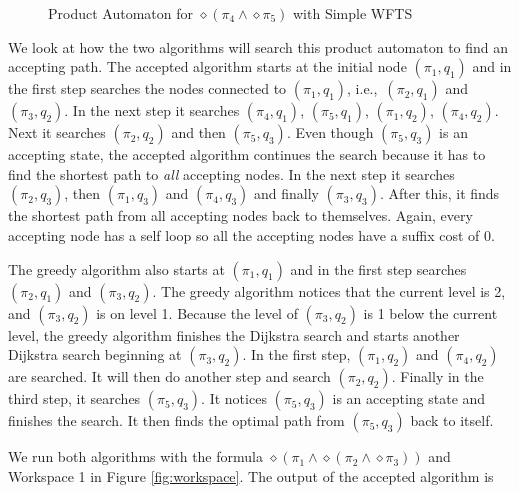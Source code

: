 \begin{figure}
\caption{Product Automaton for $\diamond (\pi_4 \wedge \diamond \pi_5)$ with Simple WFTS}
\label{fig:Sequencing}
\end{figure}

We look at how the two algorithms will search this product automaton to find an accepting path. The accepted algorithm starts at the initial node $(\pi_1,q_1)$ and in the first step searches the nodes connected to $(\pi_1,q_1)$, i.e.,\ $(\pi_2,q_1)$ and $(\pi_3,q_2)$. In the next step it searches $(\pi_4,q_1)$, $(\pi_5,q_1)$, $(\pi_1,q_2)$, $(\pi_4,q_2)$. Next it searches $(\pi_2,q_2)$ and then $(\pi_5,q_3)$. Even though $(\pi_5,q_3)$ is an accepting state, the accepted algorithm continues the search because it has to find the shortest path to \textit{all} accepting nodes. In the next step it searches $(\pi_2,q_3)$, then $(\pi_1,q_3)$ and $(\pi_4,q_3)$ and finally $(\pi_3,q_3)$. After this, it finds the shortest path from all accepting nodes back to themselves. Again, every accepting node has a self loop so all the accepting nodes have a suffix cost of 0. 



The greedy algorithm also starts at $(\pi_1,q_1)$ and in the first step searches $(\pi_2,q_1)$ and $(\pi_3,q_2)$. The greedy algorithm notices that the current level is 2, and $(\pi_3,q_2)$ is on level 1. Because the level of $(\pi_3,q_2)$ is 1 below the current level, the greedy algorithm finishes the Dijkstra search and starts another Dijkstra search beginning at $(\pi_3,q_2)$. In the first step, $(\pi_1,q_2)$ and $(\pi_4,q_2)$ are searched. It will then do another step and search $(\pi_2,q_2)$. Finally in the third step, it searches $(\pi_5,q_3)$. It notices $(\pi_5,q_3)$ is an accepting state and finishes the search. It then finds the optimal path from $(\pi_5,q_3)$ back to itself.

We run both algorithms with the formula $\diamond (\pi_1 \land \diamond(\pi_2 \land \diamond \pi_3))$ and Workspace 1 in Figure \ref{fig:workspace}. The output of the accepted algorithm is \\


